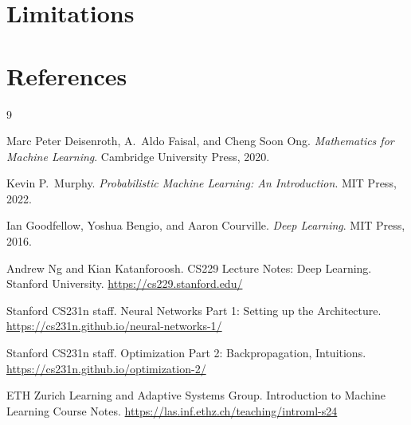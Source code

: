 \documentclass[11pt]{article}
\begin{document}
\section{Limitations}


\section*{References}

\begin{thebibliography}{9}

Marc Peter Deisenroth, A.\ Aldo Faisal, and Cheng Soon Ong.
\textit{Mathematics for Machine Learning}.
Cambridge University Press, 2020.

Kevin P.\ Murphy.
\textit{Probabilistic Machine Learning: An Introduction}.
MIT Press, 2022.

Ian Goodfellow, Yoshua Bengio, and Aaron Courville.
\textit{Deep Learning}.
MIT Press, 2016.

Andrew Ng and Kian Katanforoosh.
CS229 Lecture Notes: Deep Learning.
Stanford University.
\url{https://cs229.stanford.edu/}

Stanford CS231n staff.
Neural Networks Part 1: Setting up the Architecture.
\url{https://cs231n.github.io/neural-networks-1/}

Stanford CS231n staff.
Optimization Part 2: Backpropagation, Intuitions.
\url{https://cs231n.github.io/optimization-2/}

ETH Zurich Learning and Adaptive Systems Group.
Introduction to Machine Learning Course Notes.
\url{https://las.inf.ethz.ch/teaching/introml-s24}

\end{thebibliography}
\end{document}

